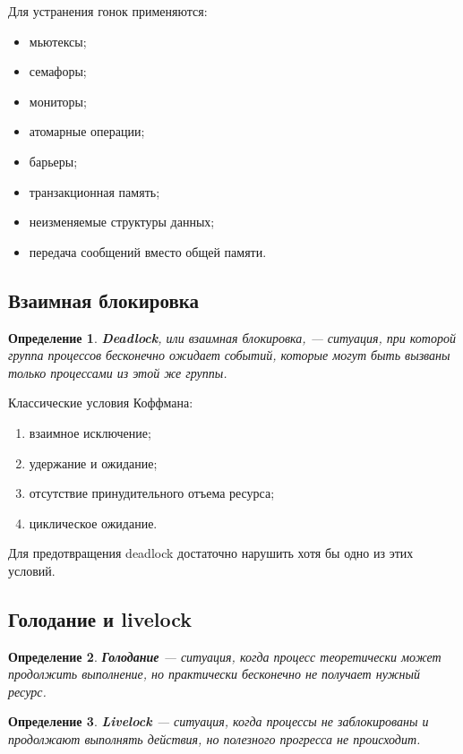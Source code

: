 \documentclass[12pt,a4paper]{article}
\newtheorem{definition}{Определение}
\begin{document}
Для устранения гонок применяются:
\begin{itemize}
    \item мьютексы;
    \item семафоры;
    \item мониторы;
    \item атомарные операции;
    \item барьеры;
    \item транзакционная память;
    \item неизменяемые структуры данных;
    \item передача сообщений вместо общей памяти.
\end{itemize}

\subsection{Взаимная блокировка}

\begin{definition}
\textbf{Deadlock}, или взаимная блокировка, --- ситуация, при которой группа процессов бесконечно ожидает событий, которые могут быть вызваны только процессами из этой же группы.
\end{definition}

Классические условия Коффмана:
\begin{enumerate}
    \item взаимное исключение;
    \item удержание и ожидание;
    \item отсутствие принудительного отъема ресурса;
    \item циклическое ожидание.
\end{enumerate}

Для предотвращения deadlock достаточно нарушить хотя бы одно из этих условий.

\subsection{Голодание и livelock}

\begin{definition}
\textbf{Голодание} --- ситуация, когда процесс теоретически может продолжить выполнение, но практически бесконечно не получает нужный ресурс.
\end{definition}

\begin{definition}
\textbf{Livelock} --- ситуация, когда процессы не заблокированы и продолжают выполнять действия, но полезного прогресса не происходит.
\end{definition}
\end{document}
